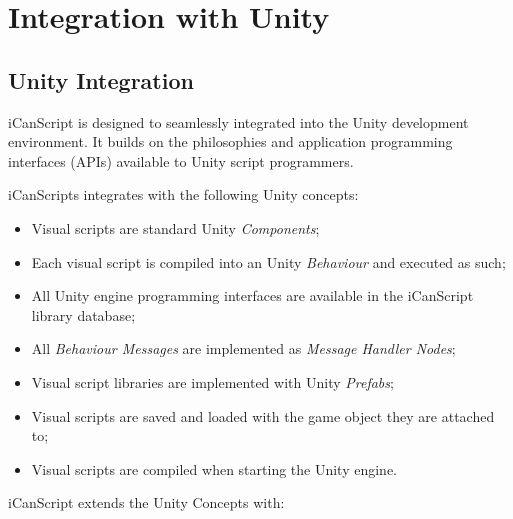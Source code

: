 \pagebreak 

\part{Integration with Unity}
\label{integrationwithunity}

\chapter{Unity Integration}
\label{unityintegration}

iCanScript is designed to seamlessly integrated into the Unity development environment. It builds on the philosophies and application programming interfaces (APIs) available to Unity script programmers.

iCanScripts integrates with the following Unity concepts:

\begin{itemize}
\item Visual scripts are standard Unity \emph{Components};

\item Each visual script is compiled into an Unity \emph{Behaviour} and executed as such;

\item All Unity engine programming interfaces are available in the iCanScript library database;

\item All \emph{Behaviour Messages} are implemented as \emph{Message Handler Nodes};

\item Visual script libraries are implemented with Unity \emph{Prefabs};

\item Visual scripts are saved and loaded with the game object they are attached to;

\item Visual scripts are compiled when starting the Unity engine.

\end{itemize}

iCanScript extends the Unity Concepts with:

